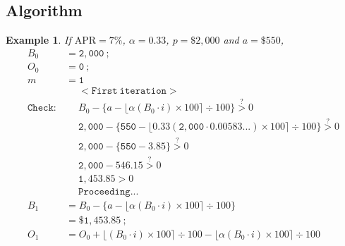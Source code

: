\documentclass[12pt,letterpaper,oneside]{article}
\newtheorem{example}{Example}[section]
\theoremstyle{remark} %
\begin{document}
	\newpage
	\subsection{Algorithm}
	\newcommand{\rate}{0.00583...}
	\newcommand{\proportion}{0.33}
	\newcommand{\amount}{550}
	\newcommand{\balance}{2,000}
	\newcommand{\interest}{0}
	\newcommand{\months}{0}
	\newcommand{\monthsp}{1}
	\newcommand{\balanceitb}{1,453.85}
	\newcommand{\interestitb}{7.82}
	\newcommand{\monthsitb}{1}
	\newcommand{\monthspitb}{2}
	\newcommand{\balanceitc}{906.65}
	\newcommand{\interestitc}{13.50}
	\newcommand{\monthsitc}{2}
	\newcommand{\monthspitc}{3}
	\newcommand{\balanceitf}{358.40}
	\newcommand{\interestitf}{17.04}
	\newcommand{\monthsitf}{3}%
	\newcommand{\monthspitf}{4}%
	\newcommand{\amountfinal}{377.53}
	\begin{example}
	If $\mbox{APR}=7\%$, $\alpha=0.33$, $p=\$2,000$ and $a=\$550$,
	\footnotesize
	\begin{align*}
	B_{0}&=\mathtt{\balance}\ ;\\
	O_{0}&=\mathtt{\interest}\ ;\\
	m&=\mathtt{\monthsp}\\[12pt]
	&\quad\;\mathtt{<First\ iteration>}\\
	\mathtt{Check:}&\quad\;B_{\months}-\Big\{a-\big\lfloor{\alpha\left(B_{\months}\cdot i\right)\times 100}\big\rceil\div 100\Big\}\overset{?}{>}0\\[-6pt]
	&\quad\;\mathtt{\balance}-\Big\{\mathtt{\amount}-\big\lfloor{\mathtt{\proportion}\left(\mathtt{\balance}\cdot \mathtt{\rate}\right)\times 100}\big\rceil\div 100\Big\}\overset{?}{>}0\\[-6pt]
	&\quad\;\mathtt{\balance}-\Big\{\mathtt{\amount}-\mathtt{3.85}\Big\}\overset{?}{>}0\\[-6pt]
	&\quad\;\mathtt{\balance}-\mathtt{546.15}\overset{?}{>}0\\
	&\quad\;\mathtt{1,453.85}>0\\
	&\quad\;\mathtt{Proceeding...}\\[12pt]
	B_{\monthsp}&=B_{\months}-\Big\{a-\big\lfloor{\alpha\left(B_{\months}\cdot i\right)\times 100}\big\rceil\div 100\Big\}\\
	&=\mathtt{\$1,453.85}\ ;\\[12pt]
	O_{\monthsp}&=O_{\months}+\big\lfloor{\left(B_{\months}\cdot i\right)\times 100}\big\rceil\div 100-\big\lfloor{\alpha\left(B_{\months}\cdot i\right)\times 100}\big\rceil\div 100\\

\end{align*}
\end{example}
\end{document}
